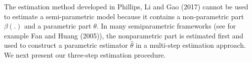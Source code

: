 \documentclass[12pt,a4paper]{article}
\begin{document}
The estimation method developed in Phillips, Li and Gao (2017) cannot be
used to estimate a semi-parametric model because it contains a non-parametric
part $\beta \left( .\right) $ and a parametric part $\theta .$ In many
semiparametric frameworks (see for example Fan and Huang (2005)), the
nonparametric part is estimated first and used to construct a parametric
estimator $\hat{\theta}$ in a multi-step estimation approach. We next present our three-step estimation procedure. 
%	
%	
%	
%	
%	
%	
%	
%	
%	
%	
%	
%	
\end{document}

